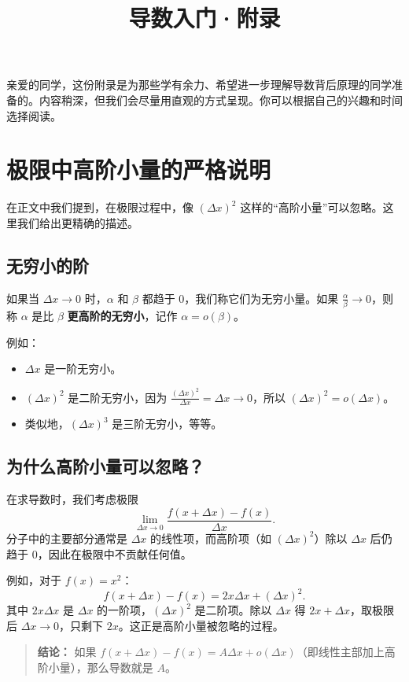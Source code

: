 \documentclass[10pt]{article}
\title{导数入门·附录}
\author{}
\date{}
\begin{document}
\maketitle

亲爱的同学，这份附录是为那些学有余力、希望进一步理解导数背后原理的同学准备的。内容稍深，但我们会尽量用直观的方式呈现。你可以根据自己的兴趣和时间选择阅读。

\section{极限中高阶小量的严格说明}

在正文中我们提到，在极限过程中，像 $(\Delta x)^2$ 这样的“高阶小量”可以忽略。这里我们给出更精确的描述。

\subsection{无穷小的阶}

如果当 $\Delta x \to 0$ 时，$\alpha$ 和 $\beta$ 都趋于 0，我们称它们为无穷小量。如果 $\frac{\alpha}{\beta} \to 0$，则称 $\alpha$ 是比 $\beta$ \textbf{更高阶的无穷小}，记作 $\alpha = o(\beta)$。

例如：
\begin{itemize}
    \item $\Delta x$ 是一阶无穷小。
    \item $(\Delta x)^2$ 是二阶无穷小，因为 $\frac{(\Delta x)^2}{\Delta x} = \Delta x \to 0$，所以 $(\Delta x)^2 = o(\Delta x)$。
    \item 类似地，$(\Delta x)^3$ 是三阶无穷小，等等。
\end{itemize}

\subsection{为什么高阶小量可以忽略？}

在求导数时，我们考虑极限
$$
\lim_{\Delta x \to 0} \frac{f(x+\Delta x)-f(x)}{\Delta x}.
$$
分子中的主要部分通常是 $\Delta x$ 的线性项，而高阶项（如 $(\Delta x)^2$）除以 $\Delta x$ 后仍趋于 0，因此在极限中不贡献任何值。

例如，对于 $f(x)=x^2$：
$$
f(x+\Delta x)-f(x) = 2x\Delta x + (\Delta x)^2.
$$
其中 $2x\Delta x$ 是 $\Delta x$ 的一阶项，$(\Delta x)^2$ 是二阶项。除以 $\Delta x$ 得 $2x + \Delta x$，取极限后 $\Delta x \to 0$，只剩下 $2x$。这正是高阶小量被忽略的过程。

\begin{quote}
    \textbf{结论：} 如果 $f(x+\Delta x)-f(x) = A\Delta x + o(\Delta x)$（即线性主部加上高阶小量），那么导数就是 $A$。
\end{quote}
\end{document}
